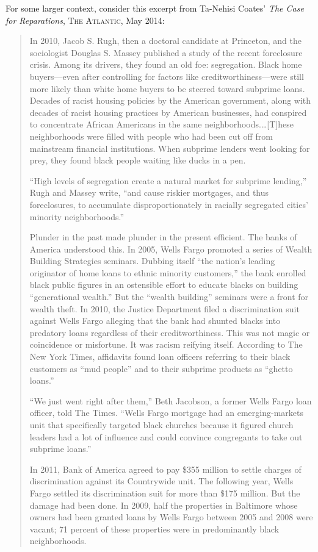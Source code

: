 \item For some larger context, consider this excerpt from Ta-Nehisi Coates'
\textit{The
Case for Reparations}, \textsc{The Atlantic}, May 2014:
\begin{quotation}
In 2010, Jacob S. Rugh, then a doctoral candidate at Princeton, and the
sociologist Douglas S. Massey published a study of the recent foreclosure
crisis. Among its drivers, they found an old foe: segregation. Black home
buyers---even after controlling for factors like creditworthiness---were
still more likely than white home buyers to be steered toward subprime loans.
Decades of racist housing policies by the American government, along with
decades of racist housing practices by American businesses, had conspired to
concentrate African Americans in the same neighborhoods.\dots [T]hese
neighborhoods were filled with people who had been cut off from mainstream
financial institutions. When subprime lenders went looking for prey, they found
black people waiting like ducks in a pen.

``High levels of segregation create a natural market for subprime lending,''
Rugh and Massey write, ``and cause riskier mortgages, and thus foreclosures, to
accumulate disproportionately in racially segregated cities' minority
neighborhoods.''

Plunder in the past made plunder in the present efficient. The banks of America
understood this. In 2005, Wells Fargo promoted a series of Wealth Building
Strategies seminars. Dubbing itself ``the nation's leading originator of home
loans to ethnic minority customers,'' the bank enrolled black public figures in
an ostensible effort to educate blacks on building ``generational wealth.'' But
the ``wealth building'' seminars were a front for wealth theft. In 2010, the
Justice Department filed a discrimination suit against Wells Fargo alleging
that the bank had shunted blacks into predatory loans regardless of their
creditworthiness. This was not magic or coincidence or misfortune. It was
racism reifying itself. According to The New York Times, affidavits found loan
officers referring to their black customers as ``mud people'' and to their
subprime products as ``ghetto loans.''

``We just went right after them,'' Beth Jacobson, a former Wells Fargo loan
officer, told The Times. ``Wells Fargo mortgage had an emerging-markets unit
that specifically targeted black churches because it figured church leaders had
a lot of influence and could convince congregants to take out subprime loans.''

In 2011, Bank of America agreed to pay \$355 million to settle charges of
discrimination against its Countrywide unit. The following year, Wells Fargo
settled its discrimination suit for more than \$175 million. But the damage had
been done. In 2009, half the properties in Baltimore whose owners had been
granted loans by Wells Fargo between 2005 and 2008 were vacant; 71 percent of
these properties were in predominantly black neighborhoods.
\end{quotation}

